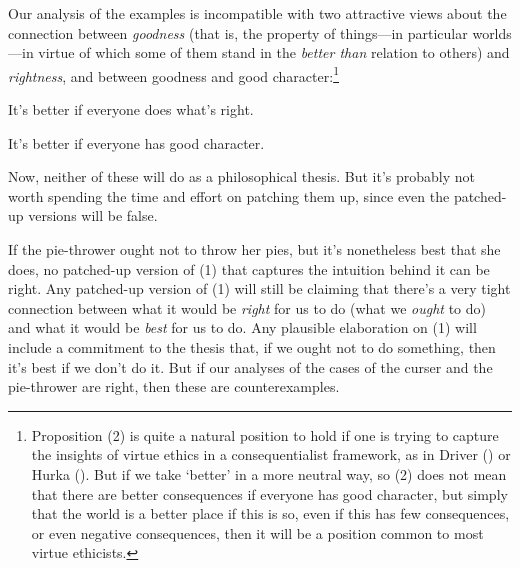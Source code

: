 \documentclass[
  10pt,
  letterpaper,
  DIV=11,
  numbers=noendperiod,
  twoside]{scrartcl}
\providecommand{\tightlist}{%
  \setlength{\itemsep}{0pt}\setlength{\parskip}{0pt}}\usepackage{longtable,booktabs,array}
\begin{document}
Our analysis of the examples is incompatible with two attractive views
about the connection between \emph{goodness} (that is, the property of
things---in particular worlds---in virtue of which some of them stand in
the \emph{better than} relation to others) and \emph{rightness}, and
between goodness and good character:\footnote{Proposition (2) is quite a
  natural position to hold if one is trying to capture the insights of
  virtue ethics in a consequentialist framework, as in Driver
  () or Hurka
  (). But if we take `better' in a more
  neutral way, so (2) does not mean that there are better consequences
  if everyone has good character, but simply that the world is a better
  place if this is so, even if this has few consequences, or even
  negative consequences, then it will be a position common to most
  virtue ethicists.}

\begin{description}
\tightlist
\item[(1)]
It's better if everyone does what's right.
\item[(2)]
It's better if everyone has good character.
\end{description}

Now, neither of these will do as a philosophical thesis. But it's
probably not worth spending the time and effort on patching them up,
since even the patched-up versions will be false.

If the pie-thrower ought not to throw her pies, but it's nonetheless
best that she does, no patched-up version of (1) that captures the
intuition behind it can be right. Any patched-up version of (1) will
still be claiming that there's a very tight connection between what it
would be \emph{right} for us to do (what we \emph{ought} to do) and what
it would be \emph{best} for us to do. Any plausible elaboration on (1)
will include a commitment to the thesis that, if we ought not to do
something, then it's best if we don't do it. But if our analyses of the
cases of the curser and the pie-thrower are right, then these are
counterexamples.
\end{document}
